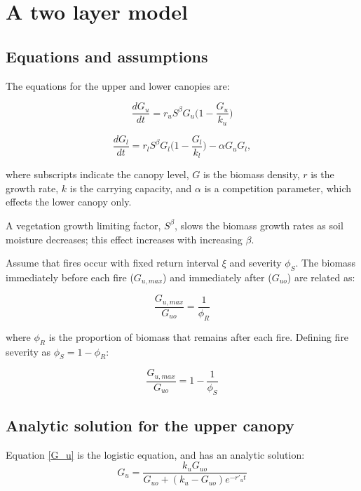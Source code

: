 \documentclass{article}
\author{octavia Crompton}
\begin{document}
\tableofcontents		
\section{ A two layer model}
\subsection{ Equations and assumptions}

The equations for the upper  and lower  canopies are:

\begin{equation}
    \frac{dG_u}{dt} =  r_{u} S^\beta G_u \big(1-\frac{G_u}{k_u}\big)
    \label{G_u}
\end{equation}

 \begin{equation}
    \frac{d G_l}{dt} = r_l S^\beta G_l \big(1-\frac{G_l}{k_l}\big) - \alpha G_u G_l,
        \label{G_l}
\end{equation}


where subscripts indicate the canopy level, $G$ is the biomass density, $r$ is the growth rate, $k$ is the carrying capacity, and $\alpha$ is a competition parameter, which effects the lower canopy only.

A vegetation growth limiting factor, $S^\beta$, slows the biomass growth rates as soil moisture decreases; this effect increases with increasing $\beta$.


Assume that fires occur with fixed return interval $\xi$  and severity $\phi_S$.
The biomass immediately before each fire  ($G_{u,max}$) and immediately after ($G_{uo}$) are related as:

\begin{equation}
    \frac{G_{u,max}}{G_{uo}} = \frac{1}{\phi_R}
\end{equation}

where $\phi_R$ is the proportion of biomass that remains after each fire.  Defining fire severity as $\phi_S = 1-\phi_R$:

\begin{equation}
    \frac{G_{u,max}}{G_{uo}} = 1 - \frac{1}{\phi_S}
\end{equation}


\subsection{  Analytic solution for the upper canopy}

Equation \ref{G_u}  is the logistic equation, and  has an analytic solution:
\begin{equation}
    G_u = \frac{k_u G_{uo}}{G_{uo} +(k_u-G_{uo}) e^{-r'_u t}}
    \label{logistic_solution}
\end{equation}
\end{document}
